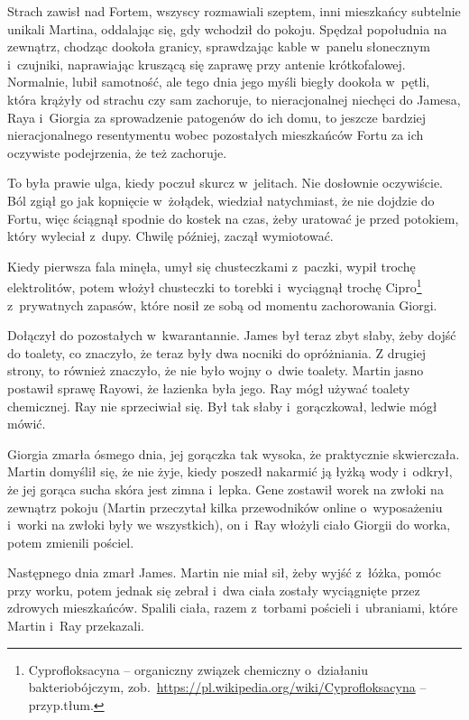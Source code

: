\documentclass[oneside,polish,11pt,sfheadings]{mwbk}
\begin{document}
Strach zawisł nad Fortem, wszyscy rozmawiali szeptem, inni mieszkańcy
subtelnie unikali Martina, oddalając się, gdy wchodził do pokoju.
Spędzał popołudnia na zewnątrz, chodząc dookoła granicy, sprawdzając
kable w~panelu słonecznym i~czujniki, naprawiając kruszącą się zaprawę
przy antenie krótkofalowej. Normalnie, lubił samotność, ale tego dnia
jego myśli biegły dookoła w~pętli, która krążyły od strachu czy sam
zachoruje, to nieracjonalnej niechęci do Jamesa, Raya i~Giorgia za
sprowadzenie patogenów do ich domu, to jeszcze bardziej nieracjonalnego
resentymentu wobec pozostałych mieszkańców Fortu za ich oczywiste
podejrzenia, że też zachoruje.

To była prawie ulga, kiedy poczuł skurcz w~jelitach. Nie dosłownie
oczywiście. Ból zgiął go jak kopnięcie w~żołądek, wiedział natychmiast,
że nie dojdzie do Fortu, więc ściągnął spodnie do kostek na czas, żeby
uratować je przed potokiem, który wyleciał z~dupy. Chwilę później,
zaczął wymiotować.

Kiedy pierwsza fala minęła, umył się chusteczkami z~paczki, wypił trochę
elektrolitów, potem włożył chusteczki to torebki i~wyciągnął trochę
Cipro\footnote{ Cyprofloksacyna -- organiczny związek chemiczny o~działaniu
bakteriobójczym,
zob.~\url{https://pl.wikipedia.org/wiki/Cyprofloksacyna} -- przyp.tłum.} z~prywatnych zapasów, które nosił ze sobą od momentu
zachorowania Giorgi.

Dołączył do pozostałych w~kwarantannie. James był teraz zbyt słaby, żeby
dojść do toalety, co znaczyło, że teraz były dwa nocniki do opróżniania.
Z drugiej strony, to również znaczyło, że nie było wojny o~dwie toalety.
Martin jasno postawił sprawę Rayowi, że łazienka była jego. Ray mógł
używać toalety chemicznej. Ray nie sprzeciwiał się. Był tak słaby i~gorączkował, ledwie mógł mówić.

Giorgia zmarła ósmego dnia, jej gorączka tak wysoka, że praktycznie
skwierczała. Martin domyślił się, że nie żyje, kiedy poszedł nakarmić ją
łyżką wody i~odkrył, że jej gorąca sucha skóra jest zimna i~lepka. Gene
zostawił worek na zwłoki na zewnątrz pokoju (Martin przeczytał kilka
przewodników online o~wyposażeniu i~worki na zwłoki były we wszystkich),
on i~Ray włożyli ciało Giorgii do worka, potem zmienili pościel.

Następnego dnia zmarł James. Martin nie miał sił, żeby wyjść z~łóżka,
pomóc przy worku, potem jednak się zebrał i~dwa ciała zostały
wyciągnięte przez zdrowych mieszkańców. Spalili ciała, razem z~torbami
pościeli i~ubraniami, które Martin i~Ray przekazali.
\end{document}
